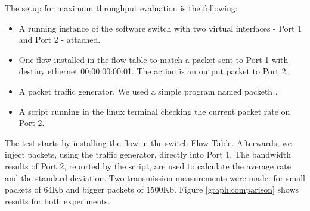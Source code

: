     The setup for maximum throughput evaluation is the following:
    
    \begin{itemize}
    \item A running instance of the software switch with two virtual interfaces - Port 1 and Port 2 - attached. 
    \item One flow installed in the flow table to match a packet sent to Port 1 with destiny ethernet 00:00:00:00:01. The action is an output packet to Port 2. 
    \item A packet traffic generator. We used a simple program named packeth \cite{packeth}.
    \item A script running in the linux terminal checking the current packet rate on Port 2.   
    \end{itemize}
    
    The test starts by installing the flow in the switch Flow Table. Afterwards, we inject packets, using the traffic generator, directly into Port 1. The bandwidth results of Port 2, reported by the script, are used to calculate the average rate and the standard deviation.  
    Two transmission measurements were made: for small packets of 64Kb and bigger packets of 1500Kb. Figure \ref{graph:comparison} shows results for both experiments.

